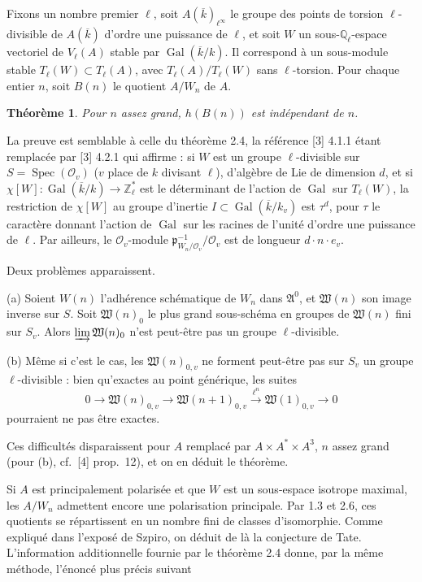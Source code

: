\documentclass[12pt,a4paper]{article}
\theoremstyle{plain}
\newtheorem{theorem}{Théorème}[section]
\theoremstyle{definition}
\theoremstyle{remark}
\DeclareMathOperator{\Spec}{Spec}
\DeclareMathOperator{\Gal}{Gal}
\newcommand{\QQ}{\mathbb{Q}}
\newcommand{\ZZ}{\mathbb{Z}}
\newcommand{\cO}{\mathcal{O}}
\newcommand{\fA}{\mathfrak{A}}
\providecommand{\QQ}{\mathbb{Q}}
\providecommand{\ZZ}{\mathbb{Z}}
\providecommand{\cO}{\mathcal{O}}
\providecommand{\fA}{\mathfrak{A}}
\providecommand{\fW}{\mathfrak{W}}
\providecommand{\Gal}{\operatorname{Gal}}
\providecommand{\Spec}{\operatorname{Spec}}
\providecommand{\fp}{\mathfrak{p}}
\begin{document}
\subsection{}

Fixons un nombre premier $\ell$, soit $A(\overline{k})_{\ell^\infty}$ le groupe des points de torsion $\ell$-divisible de $A(\overline{k})$ d'ordre une puissance de $\ell$, et soit $W$ un sous-$\QQ_\ell$-espace vectoriel de $V_\ell(A)$ stable par $\Gal(\overline{k}/k)$. Il correspond à un sous-module stable $T_\ell(W) \subset T_\ell(A)$, avec $T_\ell(A)/T_\ell(W)$ sans $\ell$-torsion. Pour chaque entier $n$, soit $B(n)$ le quotient $A/W_n$ de $A$.

\begin{theorem}
Pour $n$ assez grand, $h(B(n))$ est indépendant de $n$.
\end{theorem}

La preuve est semblable à celle du théorème 2.4, la référence [3] 4.1.1 étant remplacée par [3] 4.2.1 qui affirme : si $W$ est un groupe $\ell$-divisible sur $S = \Spec(\cO_v)$ ($v$ place de $k$ divisant $\ell$), d'algèbre de Lie de dimension $d$, et si $\chi[W] : \Gal(\overline{k}/k) \to \ZZ_\ell^*$ est le déterminant de l'action de $\Gal$ sur $T_\ell(W)$, la restriction de $\chi[W]$ au groupe d'inertie $I \subset \Gal(\overline{k}/k_v)$ est $\tau^d$, pour $\tau$ le caractère donnant l'action de $\Gal$ sur les racines de l'unité d'ordre une puissance de $\ell$. Par ailleurs, le $\cO_v$-module $\fp_{W_n/\cO_v}^{-1}/\cO_v$ est de longueur $d \cdot n \cdot e_v$.

Deux problèmes apparaissent.

(a) Soient $W(n)$ l'adhérence schématique de $W_n$ dans $\fA^0$, et $\fW(n)$ son image inverse sur $S$. Soit $\fW(n)_0$ le plus grand sous-schéma en groupes de $\fW(n)$ fini sur $S_v$. Alors $\varinjlim \fW(n)_0$ n'est peut-être pas un groupe $\ell$-divisible.

(b) Même si c'est le cas, les $\fW(n)_{0,v}$ ne forment peut-être pas sur $S_v$ un groupe $\ell$-divisible : bien qu'exactes au point générique, les suites
\[
0 \to \fW(n)_{0,v} \to \fW(n+1)_{0,v} \xrightarrow{\ell^n} \fW(1)_{0,v} \to 0
\]
pourraient ne pas être exactes.

Ces difficultés disparaissent pour $A$ remplacé par $A \times A^{*} \times A^3$, $n$ assez grand (pour (b), cf.~[4] prop.~12), et on en déduit le théorème.

Si $A$ est principalement polarisée et que $W$ est un sous-espace isotrope maximal, les $A/W_n$ admettent encore une polarisation principale. Par 1.3 et 2.6, ces quotients se répartissent en un nombre fini de classes d'isomorphie. Comme expliqué dans l'exposé de Szpiro, on déduit de là la conjecture de Tate. L'information additionnelle fournie par le théorème 2.4 donne, par la même méthode, l'énoncé plus précis suivant
\end{document}
